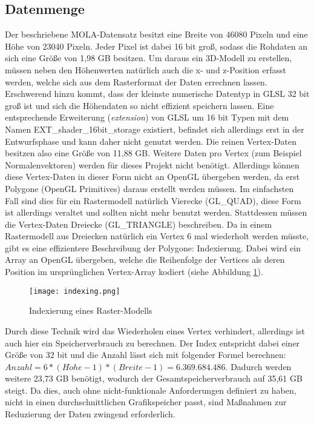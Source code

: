 \subsection{Datenmenge}\label{datenmenge}
Der beschriebene MOLA-Datensatz besitzt eine Breite von 46080 Pixeln und eine Höhe von 23040 Pixeln. Jeder Pixel ist dabei 16 bit groß, sodass die Rohdaten an sich eine Größe von 1,98 GB besitzen\cite{molaDataExtended}. Um daraus ein 3D-Modell zu erstellen, müssen neben den Höhenwerten natürlich auch die x- und z-Position erfasst werden, welche sich aus dem Rasterformat der Daten errechnen lassen. Erschwerend hinzu kommt, dass der kleinste numerische Datentyp in GLSL 32 bit groß ist\cite[Abschnitt 4.1, S. 23]{glslSpec} und sich die Höhendaten so nicht effizient speichern lassen. Eine entsprechende Erweiterung (\textit{extension}) von GLSL um 16 bit Typen mit dem Namen EXT\_shader\_16bit\_storage existiert, befindet sich allerdings erst in der Entwurfsphase und kann daher nicht genutzt werden. Die reinen Vertex-Daten besitzen also eine Größe von 11,88 GB. Weitere Daten pro Vertex (zum Beispiel Normalenvektoren) werden für dieses Projekt nicht benötigt. Allerdings können diese Vertex-Daten in dieser Form nicht an OpenGL übergeben werden, da erst Polygone (OpenGL Primitives) daraus erstellt werden müssen. Im einfachsten Fall sind dies für ein Rastermodell natürlich Vierecke (GL\_QUAD), diese Form ist allerdings veraltet und sollten nicht mehr benutzt werden. Stattdessen müssen die Vertex-Daten  Dreiecke (GL\_TRIANGLE) beschreiben. Da in einem Rastermodell aus Dreiecken natürlich ein Vertex 6 mal wiederholt werden müsste, gibt es eine effizientere Beschreibung der Polygone: Indexierung. Dabei wird ein Array an OpenGL übergeben, welche die Reihenfolge der Vertices als deren Position im ursprünglichen Vertex-Array kodiert (siehe Abbildung \ref{indexing}). 

\begin{figure}[H]
  \texttt{[image: indexing.png]}
  \caption{Indexierung eines Raster-Modells}
  \label{indexing}
\end{figure}

Durch diese Technik wird das Wiederholen eines Vertex verhindert, allerdings ist auch hier ein Speicherverbrauch zu berechnen. Der Index entspricht dabei einer Größe von 32 bit und die Anzahl lässt sich mit folgender Formel berechnen: $Anzahl = 6 * (H\ddot{o}he - 1) * (Breite - 1) = 6.369.684.486$. Dadurch werden weitere 23,73 GB benötigt, wodurch der Gesamtspeicherverbrauch auf 35,61 GB steigt. Da dies, auch ohne nicht-funktionale Anforderungen definiert zu haben, nicht in einen durchschnittlichen Grafikspeicher passt, sind Maßnahmen zur Reduzierung der Daten zwingend erforderlich.

